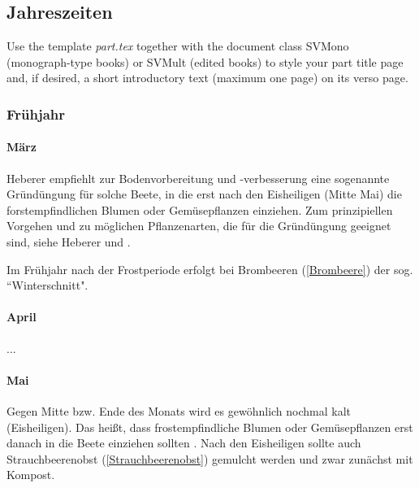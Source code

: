 % 
%
%

\begin{partbacktext}
	\part{Jahreszeiten}
	\noindent Use the template \emph{part.tex} together with the document class SVMono (monograph-type books) or SVMult (edited books) to style your part title page and, if desired, a short introductory text (maximum one page) on its verso page.


\section{Frühjahr}

\subsection{März}
\label{Mai}
Heberer \cite[S.~11]{Heberer2018} empfiehlt zur Bodenvorbereitung und -verbesserung eine sogenannte Gründüngung für solche Beete, in die erst nach den Eisheiligen (Mitte Mai) die forstempfindlichen Blumen oder Gemüsepflanzen einziehen.
Zum prinzipiellen Vorgehen und zu möglichen Pflanzenarten, die für die Gründüngung geeignet sind, siehe Heberer \cite[S.~11]{Heberer2018} und \cite[S.~114f]{Heberer2018}.

Im Frühjahr nach der Frostperiode erfolgt bei Brombeeren (\ref{Brombeere}) der sog. ``Winterschnitt".

\subsection{April}

...

\subsection{Mai}

Gegen Mitte bzw. Ende des Monats wird es gewöhnlich nochmal kalt (Eisheiligen).
Das heißt, dass frostempfindliche Blumen oder Gemüsepflanzen erst danach in die Beete einziehen sollten \cite[S.~11]{Heberer2018}.
Nach den Eisheiligen sollte auch \textrightarrow Strauchbeerenobst (\ref{Strauchbeerenobst}) gemulcht werden und zwar zunächst mit Kompost.


\end{partbacktext}
